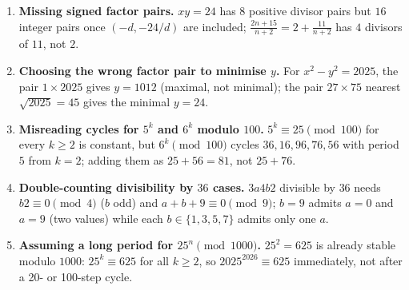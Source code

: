 \documentclass[11pt,a4paper]{article}
\begin{document}
\begin{enumerate}[leftmargin=2em, itemsep=4pt]
  \item \textbf{Missing signed factor pairs.}
        $xy=24$ has $8$ positive divisor pairs but $16$ integer pairs once $(-d,-24/d)$ are included; $\frac{2n+15}{n+2}=2+\frac{11}{n+2}$ has $4$ divisors of $11$, not $2$. 
  \item \textbf{Choosing the wrong factor pair to minimise $y$.}
        For $x^{2}-y^{2}=2025$, the pair $1\times2025$ gives $y=1012$ (maximal, not minimal); the pair $27\times75$ nearest $\sqrt{2025}=45$ gives the minimal $y=24$. 
  \item \textbf{Misreading cycles for $5^{k}$ and $6^{k}$ modulo $100$.}
        $5^{k}\equiv25\pmod{100}$ for every $k\ge2$ is constant, but $6^{k}\pmod{100}$ cycles $36,16,96,76,56$ with period $5$ from $k=2$; adding them as $25+56=81$, not $25+76$. 
  \item \textbf{Double-counting divisibility by $36$ cases.}
        $3a4b2$ divisible by $36$ needs $b2\equiv0\pmod4$ ($b$ odd) and $a+b+9\equiv0\pmod9$; $b=9$ admits $a=0$ and $a=9$ (two values) while each $b\in\{1,3,5,7\}$ admits only one $a$. 
  \item \textbf{Assuming a long period for $25^{n}\pmod{1000}$.}
        $25^{2}=625$ is already stable modulo $1000$: $25^{k}\equiv625$ for all $k\ge2$, so $2025^{2026}\equiv625$ immediately, not after a 20- or 100-step cycle. 
\end{enumerate}

\end{document}

